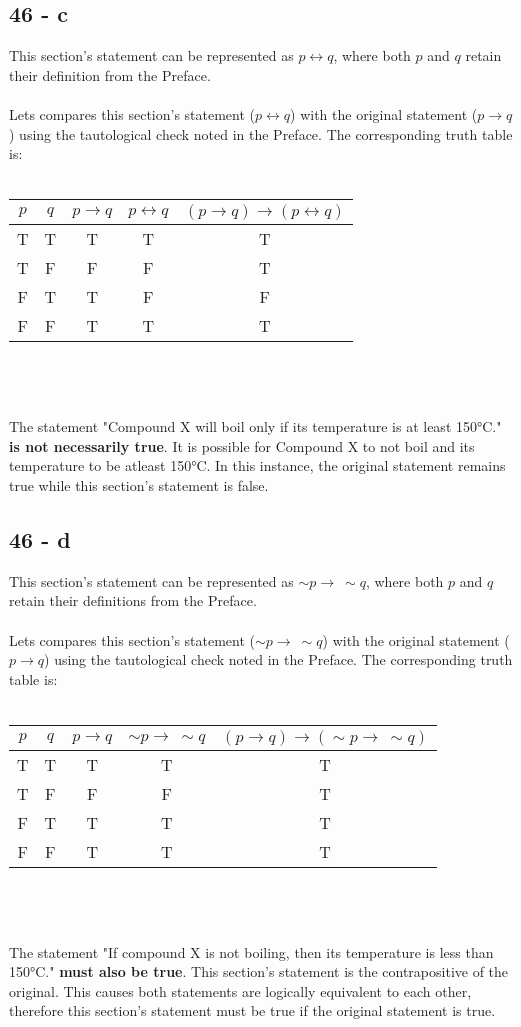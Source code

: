 \documentclass[12pt]{article}
\begin{document}
\subsection*{46 - c}
This section's statement can be represented as $p \leftrightarrow q$, where both $p$ and $q$ retain their definition from the Preface.
\\ \\
Lets compares this section's statement ($p \leftrightarrow q$) with the original statement ($p \rightarrow q$) using the tautological check noted in the Preface. The corresponding truth table is: \\ \\
\begin{tabular}{c c|c c|c}
  $p$ & $q$ 
  & $p \rightarrow q$ & $p \leftrightarrow q$
  & $(p \rightarrow q) \rightarrow (p \leftrightarrow q)$\\
  \hline
  T&T&T&T&T \\
  T&F&F&F&T \\
  F&T&T&F&F \\
  F&F&T&T&T \\
\end{tabular}
\\ \\ \\
The statement "Compound X will boil only if its temperature is at least 150°C." \textbf{is not necessarily true}. It is possible for Compound X to not boil and its temperature to be atleast 150°C. In this instance, the original statement remains true while this section's statement is false.

\subsection*{46 - d}
This section's statement can be represented as $\sim p \rightarrow \ \sim q$, where both $p$ and $q$ retain their definitions from the Preface.
\\ \\
Lets compares this section's statement ($\sim p \rightarrow \ \sim q$) with the original statement ($p \rightarrow q$) using the tautological check noted in the Preface. The corresponding truth table is:  \\ \\
\begin{tabular}{c c|c c|c}
  $p$ & $q$ 
  & $p \rightarrow q$ & $\sim p \rightarrow \ \sim q$
  & $(p \rightarrow q) \rightarrow (\sim p \rightarrow \ \sim q)$\\
  \hline
  T&T&T&T&T \\
  T&F&F&F&T \\
  F&T&T&T&T \\
  F&F&T&T&T \\
\end{tabular}
\\ \\ \\
The statement "If compound X is not boiling, then its temperature is less than 150°C." \textbf{must also be true}. This section's statement is the contrapositive of the original. This causes both statements are logically equivalent to each other, therefore this section's statement must be true if the original statement is true.
\end{document}
